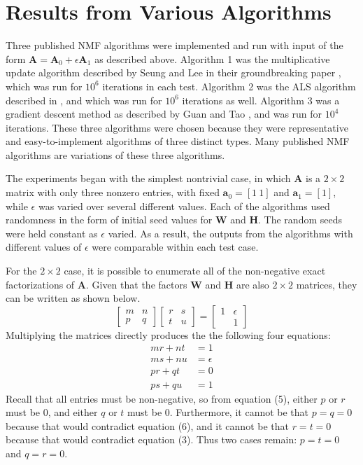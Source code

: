 \documentclass[conference]{IEEEtran}
\begin{document}
\section{Results from Various Algorithms}
Three published NMF algorithms were implemented and run with input of the form $ \mathbf{A} = \mathbf{A}_0 + \epsilon \mathbf{A}_1 $ as described above.  Algorithm 1 was the multiplicative update algorithm described by Seung and Lee in their groundbreaking paper \cite{NIPS2000_1861}, which was run for $ 10^6 $ iterations in each test.  Algorithm 2 was the ALS algorithm described in \cite{ALS}, and which was run for $ 10^6 $ iterations as well.  Algorithm 3 was a gradient descent method as described by Guan and Tao \cite{GradDes}, and was run for $ 10^4 $ iterations.  These three algorithms were chosen because they were representative and easy-to-implement algorithms of three distinct types.  Many published NMF algorithms are variations of these three algorithms.

The experiments began with the simplest nontrivial case, in which $ \mathbf{A} $ is a $ 2 \times 2 $ matrix with only three nonzero entries, with fixed $ \mathbf{a}_0 = [1~1] $ and $ \mathbf{a}_1 = [1] $, while  $ \epsilon $ was varied over several different values.  Each of the algorithms used randomness in the form of initial seed values for $ \mathbf{W} $ and $ \mathbf{H} $. The random seeds were held constant as $ \epsilon $ varied.  As a result, the outputs from the algorithms with different values of $ \epsilon $ were comparable within each test case.

For the $ 2 \times 2 $ case, it is possible to enumerate all of the non-negative exact factorizations of $ \mathbf{A} $.  Given that the factors $ \mathbf{W} $ and $ \mathbf{H} $ are also $ 2 \times 2 $ matrices, they can be written as shown below.
\begin{equation}
\left[ \begin{array}{cc} m & n \\ p & q \end{array} \right] \left[ \begin{array}{cc} r & s \\ t & u \end{array} \right] = \left[ \begin{array}{cc} 1 & \epsilon \\ & 1 \end{array} \right]
\end{equation}
Multiplying the matrices directly produces the the following four equations:
\begin{align}
mr + nt & = 1 \\
ms + nu & = \epsilon \\
pr + qt & = 0 \\
ps + qu & = 1
\end{align}
Recall that all entries must be non-negative, so from equation (5), either $ p $ or $ r $ must be 0, and either $ q $ or $ t $ must be 0.  Furthermore, it cannot be that $ p = q = 0 $ because that would contradict equation (6), and it cannot be that $ r = t = 0 $ because that would contradict equation (3).  Thus two cases remain: $ p = t = 0 $ and $ q = r = 0 $.
\end{document}
